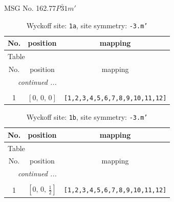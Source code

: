 \documentclass[fleqn,8pt]{jsarticle}
\begin{document}
\setcounter{MaxMatrixCols}{32}

\renewcommand{\tablename}{Table~}
\renewcommand{\figurename}{Figure~}
\begin{center}
\LARGE
MSG No. 162.77\quad$P\bar{3}1m'$
\end{center}
\renewcommand{\arraystretch}{1.2}
\begin{longtable}{ccc}
\caption{Wyckoff site: {\tt 1a}, site symmetry: {\tt -3.m'}}
 \\
 \hline \hline
No. & position & mapping \\ \hline \endfirsthead

\multicolumn{2}{l}{\tablename\ \thetable{}} \\
 \hline \hline
No. & position & mapping \\ \hline \endhead

 \hline \hline
\multicolumn{2}{r}{\footnotesize\it continued ...} \\ \endfoot

 \hline \hline
\multicolumn{2}{r}{} \\ \endlastfoot

1 & $\left[ 0,\, 0,\, 0 \right]$ & {\tt [1,2,3,4,5,6,7,8,9,10,11,12]} \\
\end{longtable}
\renewcommand{\arraystretch}{1.2}
\begin{longtable}{ccc}
\caption{Wyckoff site: {\tt 1b}, site symmetry: {\tt -3.m'}}
 \\
 \hline \hline
No. & position & mapping \\ \hline \endfirsthead

\multicolumn{2}{l}{\tablename\ \thetable{}} \\
 \hline \hline
No. & position & mapping \\ \hline \endhead

 \hline \hline
\multicolumn{2}{r}{\footnotesize\it continued ...} \\ \endfoot

 \hline \hline
\multicolumn{2}{r}{} \\ \endlastfoot

1 & $\left[ 0,\, 0,\, \frac{1}{2} \right]$ & {\tt [1,2,3,4,5,6,7,8,9,10,11,12]} \\
\end{longtable}
\renewcommand{\arraystretch}{1.2}
\end{document}
